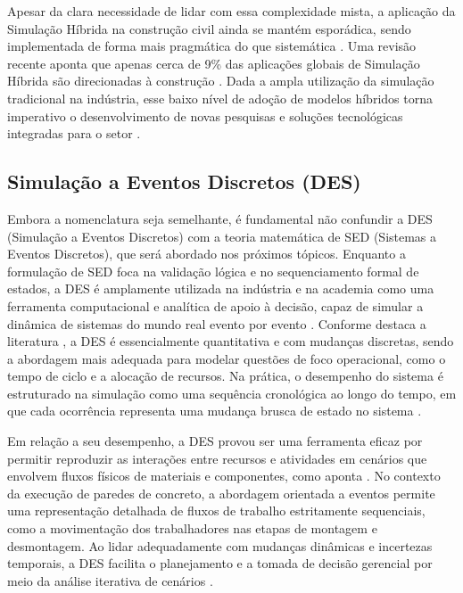 Apesar da clara necessidade de lidar com essa complexidade mista, a aplicação da Simulação Híbrida na construção civil ainda se mantém esporádica, sendo implementada de forma mais pragmática do que sistemática \cite{fakhimi2023}. Uma revisão recente aponta que apenas cerca de 9\% das aplicações globais de Simulação Híbrida são direcionadas à construção \cite{fakhimi2023}. Dada a ampla utilização da simulação tradicional na indústria, esse baixo nível de adoção de modelos híbridos torna imperativo o desenvolvimento de novas pesquisas e soluções tecnológicas integradas para o setor \cite{fakhimi2023}.

\subsection{Simulação a Eventos Discretos (DES)}
\label{sec:DE}

Embora a nomenclatura seja semelhante, é fundamental não confundir a DES (Simulação a Eventos Discretos) com a teoria matemática de SED (Sistemas a Eventos Discretos), que será abordado nos próximos tópicos. Enquanto a formulação de SED foca na validação lógica e no sequenciamento formal de estados, a DES é amplamente utilizada na indústria e na academia como uma ferramenta computacional e analítica de apoio à decisão, capaz de simular a dinâmica de sistemas do mundo real evento por evento \cite{babulak2010}. Conforme destaca a literatura \cite{hybridframework}, a DES é essencialmente quantitativa e com mudanças discretas, sendo a abordagem mais adequada para modelar questões de foco operacional, como o tempo de ciclo e a alocação de recursos. Na prática, o desempenho do sistema é estruturado na simulação como uma sequência cronológica ao longo do tempo, em que cada ocorrência representa uma mudança brusca de estado no sistema \cite{zamani2024}.

Em relação a seu desempenho, a DES provou ser uma ferramenta eficaz por permitir reproduzir as interações entre recursos e atividades em cenários que envolvem fluxos físicos de materiais e componentes, como aponta . No contexto da execução de paredes de concreto, a abordagem orientada a eventos permite uma representação detalhada de fluxos de trabalho estritamente sequenciais, como a movimentação dos trabalhadores nas etapas de montagem e desmontagem. Ao lidar adequadamente com mudanças dinâmicas e incertezas temporais, a DES facilita o planejamento e a tomada de decisão gerencial por meio da análise iterativa de cenários \cite{zamani2024}.

